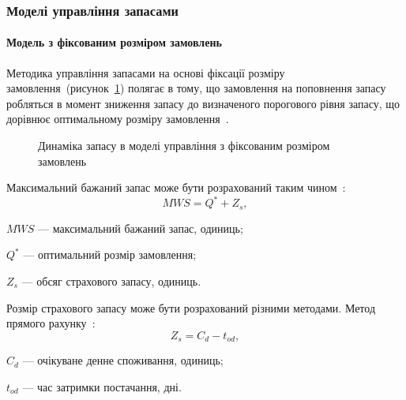 \subsubsection{Моделі управління запасами}
\paragraph{Модель з фіксованим розміром замовлень}
Методика управління запасами на основі фіксації розміру замовлення~(рисунок~\ref{fig:model_fs:dynamic}) полягає в тому, що замовлення на поповнення запасу робляться в момент зниження запасу до визначеного порогового рівня запасу, що дорівнює оптимальному розміру замовлення~\cite{Sterligova2008}. 

\begin{figure}[H]
  \centering
{}
  \captionsetup{justification=centering}
  \caption{Динаміка запасу в моделі управління з фіксованим розміром замовлень}
  \label{fig:model_fs:dynamic}
\end{figure}

Максимальний бажаний запас може бути розрахований таким чином~\cite{Sterligova2008}:
\begin{equation} \label{eq:model_fs:mws}
MWS=Q^*+Z_s
,
\end{equation}
\begin{description}
	\item[де] $MWS$ --- максимальний бажаний запас, одиниць;
	\item $Q^*$ --- оптимальний розмір замовлення;
	\item $Z_s$ --- обсяг страхового запасу, одиниць.
\end{description}

Розмір страхового запасу може бути розрахований різними методами.
Метод прямого рахунку~\cite{Sterligova2008}:
\begin{equation} \label{eq:model_fs:zs1}
Z_s=C_d-t_{od}
,
\end{equation}
\begin{description}
	\item[де] $C_d$ --- очікуване денне споживання, одиниць;
	\item $t_{od}$ --- час затримки постачання, дні.
\end{description}


